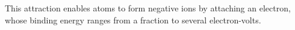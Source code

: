 This attraction enables atoms to form negative ions by attaching an electron, whose binding energy ranges from a fraction to several electron-volts.
